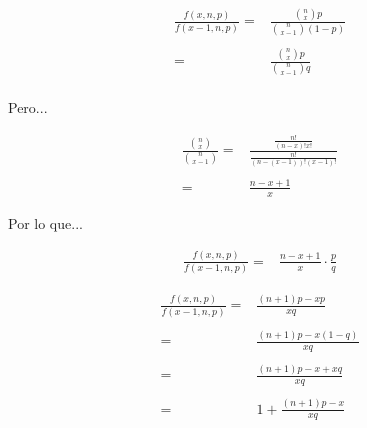 \documentclass{beamer}
\begin{document}
\begin{frame}{}
  \begin{equation}
    \begin{array}{rr}
    \frac{f(x,n,p)}{f(x-1,n,p)} = & \frac{\binom{n}{x} p}{\binom{n}{x-1} (1-p)} \\
    \\
                                = & \frac{\binom{n}{x} p}{\binom{n}{x-1} q} \\
    \end{array}
  \end{equation}

  Pero...
  
  \begin{equation}
    \begin{array}{rr}
    \frac{\binom{n}{x}}{\binom{n}{x-1}} = & \frac{\frac{n!}{(n-x)!x!}}{\frac{n!}{(n-(x-1))!(x-1)!}} \\
    \\
                                        = & \frac{n-x+1}{x}
    \end{array}
  \end{equation}

  Por lo que...

  \begin{equation}
    \begin{array}{rr}
    \frac{f(x,n,p)}{f(x-1,n,p)} = & \frac{n-x+1}{x} \cdot \frac{p}{q}
    \end{array}
  \end{equation}

\end{frame}

\begin{frame}{}
  \begin{equation}
    \begin{array}{rr}
    \frac{f(x,n,p)}{f(x-1,n,p)} = & \frac{(n+1)p - xp}{xq} \\
    \\
                                = & \frac{(n+1)p - x(1-q)}{xq} \\
    \\
                                = & \frac{(n+1)p - x + xq}{xq} \\
    \\
                                = & 1 + \frac{(n+1)p - x}{xq} \\
    \end{array}
  \end{equation}

\end{frame}
\end{document}
